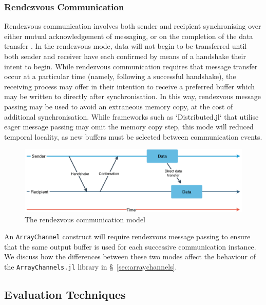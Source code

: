 \documentclass{juliacon}
\begin{document}
\subsubsection{Rendezvous Communication}
\label{sec:rendezvous}

Rendezvous communication involves both sender and recipient
synchronising over either mutual acknowledgement of messaging, or on the
completion of the data transfer \cite{illinois, ompi}. In the rendezvous
mode, data will not begin to be transferred until both sender and
receiver have each confirmed by means of a handshake their intent to
begin. While rendezvous communication requires that message transfer
occur at a particular time (namely, following a successful handshake),
the receiving process may offer in their intention to receive a preferred
buffer which may be written to directly after synchronisation. In this
way, rendezvous message passing may be used to avoid an extraneous
memory copy, at the cost of additional synchronisation. While frameworks such as `Distributed.jl` that utilise eager message passing may omit the memory copy step, this mode will reduced temporal locality, as new buffers must be selected between communication events.

\begin{figure}[htb]
	\includegraphics[width=\linewidth]{figs/Rendezvous.pdf}
	\caption{The rendezvous communication model}
	\label{fig:rendezvous}
\end{figure}

An \texttt{ArrayChannel} construct will require rendezvous message
passing to ensure that the same output buffer is used for each
successive communication instance. We discuss how the differences
between these two modes affect the behaviour of the
\texttt{ArrayChannels.jl} library in \S~\ref{sec:arraychannels}.

\subsection{Evaluation Techniques}
\label{sec:eval}
\end{document}
